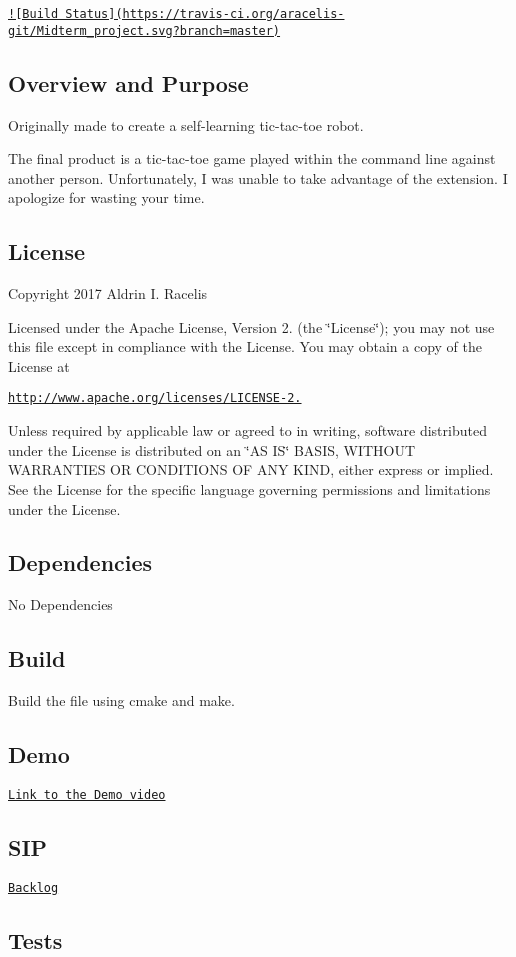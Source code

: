 \href{https://travis-ci.org/aracelis-git/Midterm_project}{\tt !\mbox{[}Build Status\mbox{]}(https\-://travis-\/ci.\-org/aracelis-\/git/\-Midterm\-\_\-project.\-svg?branch=master)} 



\subsection*{Overview and Purpose}

Originally made to create a self-\/learning tic-\/tac-\/toe robot.

The final product is a tic-\/tac-\/toe game played within the command line against another person. Unfortunately, I was unable to take advantage of the extension. I apologize for wasting your time.

\subsection*{License}

Copyright 2017 Aldrin I. Racelis

Licensed under the Apache License, Version 2. (the \char`\"{}\-License\char`\"{}); you may not use this file except in compliance with the License. You may obtain a copy of the License at

\href{http://www.apache.org/licenses/LICENSE-2.0}{\tt http\-://www.\-apache.\-org/licenses/\-L\-I\-C\-E\-N\-S\-E-\/2.}

Unless required by applicable law or agreed to in writing, software distributed under the License is distributed on an \char`\"{}\-A\-S I\-S\char`\"{} B\-A\-S\-I\-S, W\-I\-T\-H\-O\-U\-T W\-A\-R\-R\-A\-N\-T\-I\-E\-S O\-R C\-O\-N\-D\-I\-T\-I\-O\-N\-S O\-F A\-N\-Y K\-I\-N\-D, either express or implied. See the License for the specific language governing permissions and limitations under the License.

\subsection*{Dependencies}

No Dependencies

\subsection*{Build}

Build the file using cmake and make.

\subsection*{Demo}

\href{https://drive.google.com/open?id=0BxfrmvtnmsrXdmNpLXRlMXR1T3M}{\tt Link to the Demo video}

\subsection*{S\-I\-P}

\href{https://drive.google.com/open?id=1KFQ9Ns8AJOG_RbMY5DaGz2tUdGVuaAmlSZTdXr1TY-M}{\tt Backlog}

\subsection*{Tests}